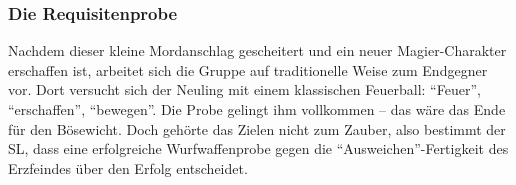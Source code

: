 \subsubsection{Die Requisitenprobe}

Nachdem dieser kleine Mordanschlag gescheitert und ein neuer Magier-Charakter erschaffen ist, arbeitet sich die Gruppe auf traditionelle Weise zum Endgegner vor. Dort versucht sich der Neuling mit einem klassischen Feuerball:
"`Feuer"', "`erschaffen"', "`bewegen"'. Die Probe gelingt ihm vollkommen -- das wäre das Ende für den Bösewicht. Doch gehörte das Zielen nicht zum Zauber, also bestimmt der SL, dass eine erfolgreiche Wurfwaffenprobe gegen die "`Ausweichen"'-Fertigkeit des Erzfeindes über den Erfolg entscheidet.

